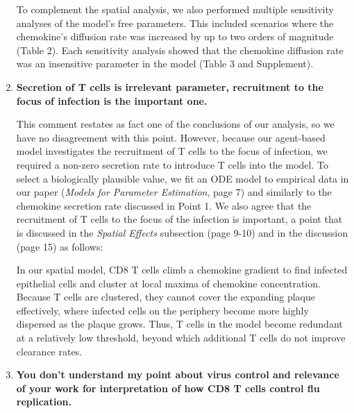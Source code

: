 \documentclass[10pt]{article}
\newenvironment{response}{\fontfamily{cmr}}{\par}
\begin{document}
\begin{enumerate}
\begin{response}
To complement the spatial analysis, we also performed multiple
sensitivity analyses of the model's free parameters.  This included scenarios where the chemokine's diffusion rate was increased by up to two orders of magnitude (Table 2).  Each sensitivity analysis showed that the chemokine diffusion rate was an insensitive parameter in the model (Table 3 and Supplement).

\end{response}


\item \textbf{Secretion of T cells is irrelevant parameter, recruitment to the focus of 
infection is the important one.}

\begin{response}
This comment restates as fact one of the conclusions of our analysis,
so we have no disagreement with this point.
However, because our agent-based model investigates the recruitment of
T cells to the focus of infection, we required a non-zero secretion
rate to introduce T cells into the model.  To select a biologically
plausible value, we fit an ODE model to empirical data in our paper
(\textit{Models for Parameter Estimation}, page 7) and similarly to
the chemokine secretion rate discussed in Point 1.  We also agree that
the recruitment of T cells to the focus of the infection is important,
a point that is discussed in the \textit{Spatial Effects} subsection (page 9-10)
and in the discussion (page 15) as follows:

\begin{displayquote}
In our spatial model, CD8 T cells climb a chemokine gradient to find infected epithelial cells and
cluster at local maxima of chemokine concentration. Because T cells are clustered, they cannot cover the
expanding plaque effectively, where infected cells on the periphery become more highly dispersed as the
plaque grows. Thus, T cells in the model become redundant at a relatively low threshold, beyond which
additional T cells do not improve clearance rates.
\end{displayquote}

\end{response}

\item \textbf{You don't understand my point about virus control and relevance of your work
for interpretation of how CD8 T cells control flu replication.}


\end{enumerate}
\end{document}
